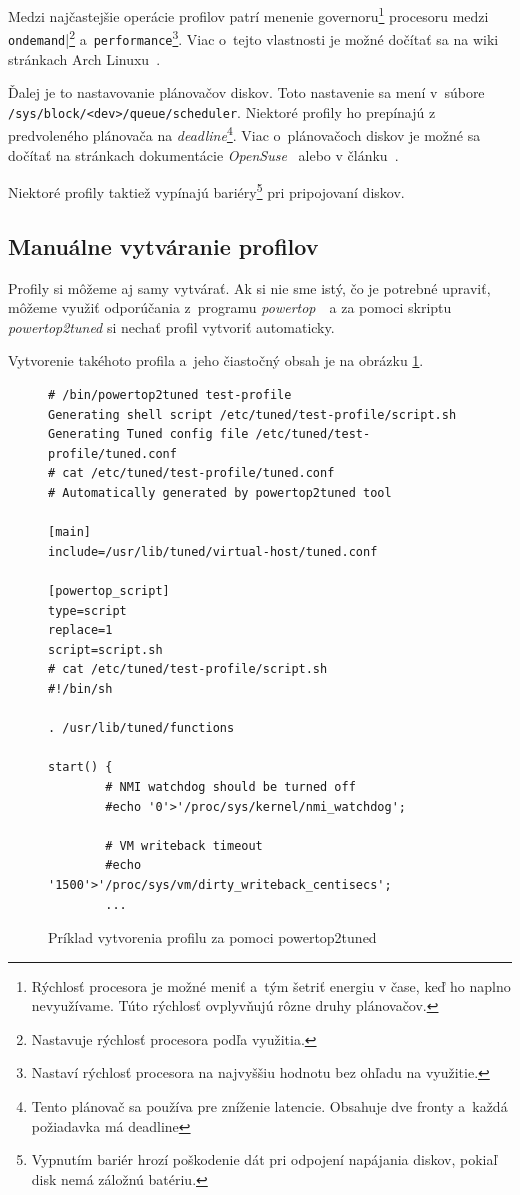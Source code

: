 Medzi najčastejšie operácie profilov patrí menenie governoru\footnote{Rýchlosť
procesora je možné meniť a~tým šetriť energiu v čase, keď ho naplno
nevyužívame. Túto rýchlosť ovplyvňujú rôzne druhy plánovačov.} procesoru medzi
\texttt{ondemand}|\footnote{Nastavuje rýchlosť procesora podľa využitia.}
a~\texttt{performance}\footnote{Nastaví rýchlosť procesora na najvyššiu hodnotu
bez ohľadu na využitie.}. Viac o~tejto vlastnosti je možné dočítať sa na wiki
stránkach Arch Linuxu~\cite{arch:governor}.

Ďalej je to nastavovanie plánovačov diskov. Toto nastavenie sa mení v~súbore
\texttt{/sys\-/block\-/<dev>\-/queue\-/scheduler}. Niektoré profily ho prepínajú z
predvoleného plánovača na \emph{deadline}\footnote{Tento plánovač sa používa
pre zníženie latencie. Obsahuje dve fronty a~každá požiadavka má deadline}.
Viac o~plánovačoch diskov je možné sa dočítať na stránkach dokumentácie
\emph{OpenSuse}~\cite{suse:scheduler} alebo v článku~\cite{book:scheduler}.

Niektoré profily taktiež vypínajú bariéry\footnote{Vypnutím bariér hrozí
poškodenie dát pri odpojení napájania diskov, pokiaľ disk nemá záložnú
batériu.} pri pripojovaní diskov. 

%
%

\subsection{Manuálne vytváranie profilov}
\label{sec:powertop2tuned}

Profily si môžeme aj samy vytvárať. Ak si nie sme istý, čo je potrebné upraviť,
môžeme využiť odporúčania z~programu \emph{powertop}~\cite{powertopHomepage}~a
za pomoci skriptu \emph{powertop2tuned} si nechať profil vytvoriť automaticky.

Vytvorenie takéhoto profila a~jeho čiastočný obsah je na obrázku \ref{alg:powertop2tuned}.

\begin{figure}[H]
\begin{lstlisting}
# /bin/powertop2tuned test-profile
Generating shell script /etc/tuned/test-profile/script.sh
Generating Tuned config file /etc/tuned/test-profile/tuned.conf
# cat /etc/tuned/test-profile/tuned.conf
# Automatically generated by powertop2tuned tool

[main]
include=/usr/lib/tuned/virtual-host/tuned.conf

[powertop_script]
type=script
replace=1
script=script.sh
# cat /etc/tuned/test-profile/script.sh
#!/bin/sh

. /usr/lib/tuned/functions

start() {
        # NMI watchdog should be turned off
        #echo '0'>'/proc/sys/kernel/nmi_watchdog';

        # VM writeback timeout
        #echo '1500'>'/proc/sys/vm/dirty_writeback_centisecs';
        ...
\end{lstlisting}
\caption{Príklad vytvorenia profilu za pomoci powertop2tuned}
\label{alg:powertop2tuned}
\end{figure}

